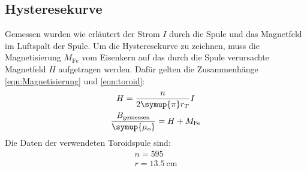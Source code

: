 \subsection{Hysteresekurve}
    Gemessen wurden wie erläutert der Strom $I$ durch die Spule und das Magnetfeld im Luftspalt der Spule. 
    Um die Hysteresekurve zu zeichnen, muss die Magnetisierung $M_\text{Fe}$ vom Eisenkern auf das durch die Spule verursachte 
    Magnetfeld $H$ aufgetragen werden. 
    Dafür gelten die Zusammenhänge \eqref{eqn:Magnetisierung} und \eqref{eqn:toroid}: %
    \begin{gather}
        H=\frac{n}{2\symup{\pi}r_T} I \\
        \frac{B_\text{gemessen}}{\symup{\mu_o}} = H+M_\text{Fe}
    \end{gather}
    Die Daten der verwendeten Toroidspule sind:
    \begin{gather*}
        n=595 \\
        r=\SI{13.5}{\centi\meter}
    \end{gather*}
